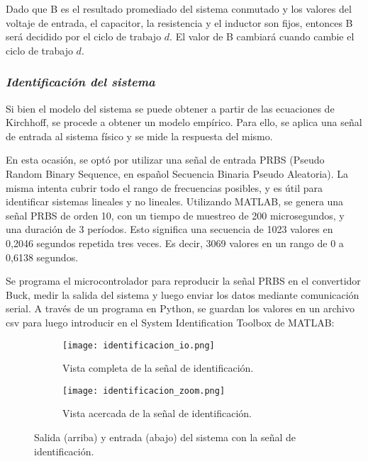 Dado que B es el resultado promediado del sistema conmutado y los valores del voltaje de entrada,
el capacitor, la resistencia y el inductor son fijos, entonces B será decidido por el ciclo de
trabajo $d$. El valor de B cambiará cuando cambie el ciclo de trabajo $d$.



\subsubsection*{\it{Identificación del sistema}}
\vspace{-0.25cm}
Si bien el modelo del sistema se puede obtener a partir de las ecuaciones de Kirchhoff, se procede
a obtener un modelo empírico. Para ello, se aplica una señal de entrada al sistema físico y se
mide la respuesta del mismo.

En esta ocasión, se optó por utilizar una señal de entrada PRBS
(Pseudo Random Binary Sequence, en español Secuencia Binaria Pseudo Aleatoria). La misma intenta
cubrir todo el rango de frecuencias posibles, y es útil para identificar sistemas lineales y no lineales.
Utilizando MATLAB, se genera una señal PRBS de orden 10, con un tiempo de muestreo de 200 microsegundos,
y una duración de 3 períodos. Esto significa una secuencia de 1023 valores en 0,2046 segundos repetida tres veces.
Es decir, 3069 valores en un rango de 0 a 0,6138 segundos.

Se programa el microcontrolador para reproducir la señal PRBS en el convertidor Buck, medir la salida
del sistema y luego enviar los datos mediante comunicación serial. A través de un programa en Python, se guardan
los valores en un archivo csv para luego introducir en el System Identification Toolbox de MATLAB:


\begin{figure}[H]
    \centering

    \begin{subfigure}[b]{\textwidth}
        \centering
        \texttt{[image: identificacion\_io.png]}
        \caption{Vista completa de la señal de identificación.}
        \label{fig:identificacion_io_gral}
    \end{subfigure}
    \begin{subfigure}[b]{\textwidth}
        \centering
        \texttt{[image: identificacion\_zoom.png]}
        \caption{Vista acercada de la señal de identificación.}
        \label{fig:identificacion_io_zoom}
    \end{subfigure}

    \vspace{-0.25cm}
    \caption{Salida (arriba) y entrada (abajo) del sistema con la señal de identificación.}
    \label{fig:identificacion_io}
\end{figure}
\vspace{-0.5cm}


